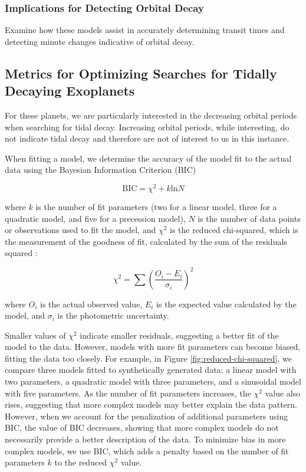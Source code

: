 \documentclass[oneside,12pt]{amsart}
\numberwithin{page}{section}
\begin{document}
\subsubsection{Implications for Detecting Orbital Decay}
Examine how these models assist in accurately determining transit times and detecting minute changes indicative of orbital decay.





\subsection{Metrics for Optimizing Searches for Tidally Decaying Exoplanets}

For these planets, we are particularly interested in the decreasing orbital periods when searching for tidal decay. Increasing orbital periods, while interesting, do not indicate tidal decay and therefore are not of interest to us in this instance. 

When fitting a model, we determine the accuracy of the model fit to the actual data using the Bayesian Information Criterion (BIC) \citep{schwarz1978estimating}

\begin{equation}
    \text{BIC} = \chi^{2} + k\text{ln}N
\end{equation}

where $k$ is the number of fit parameters (two for a linear model, three for a quadratic model, and five for a precession model), $N$ is the number of data points or observations used to fit the model, and $\chi^{2}$ is the reduced chi-squared, which is the measurement of the goodness of fit, calculated by the sum of the residuals squared \citep{pearson1900criterion}:

\begin{equation}
    \chi^{2} = \sum \left( \frac{O_i - E_i}{\sigma_i} \right)^2
\end{equation}

where $O_i$ is the actual observed value, $E_i$ is the expected value calculated by the model, and $\sigma_i$ is the photometric uncertainty.

Smaller values of $\chi^2$ indicate smaller residuals, suggesting a better fit of the model to the data. However, models with more fit parameters can become biased, fitting the data too closely. For example, in Figure \ref{fig:reduced-chi-squared}, we compare three models fitted to synthetically generated data: a linear model with two parameters, a quadratic model with three parameters, and a sinusoidal model with five parameters. As the number of fit parameters increases, the $\chi^2$ value also rises, suggesting that more complex models may better explain the data pattern. However, when we account for the penalization of additional parameters using BIC, the value of BIC decreases, showing that more complex models do not necessarily provide a better description of the data. To minimize bias in more complex models, we use BIC, which adds a penalty based on the number of fit parameters $k$ to the reduced $\chi^2$ value.
\end{document}
